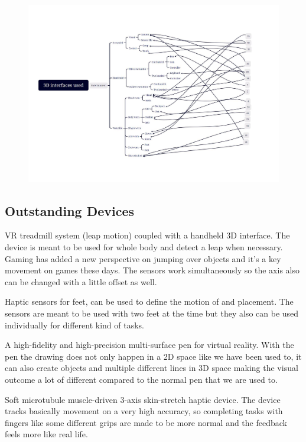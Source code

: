 \begin{figure}[htbp]
	\includegraphics[width=\columnwidth]{figures/entertainment.pdf}
	\label{fig:entertainment}
\end{figure}


\subsection{Outstanding Devices}
VR treadmill system (leap motion) coupled with a handheld 3D interface. The device is meant to be used for whole body and detect a leap when necessary. Gaming has added a new perspective on jumping over objects and it's a key movement on games these days. The sensors work simultaneously so the axis also can be changed with a little offset as well.

Haptic sensors for feet, can be used to define the motion of and placement. The sensors are meant to be used with two feet at the time but they also can be used individually for different kind of tasks. 

A high-fidelity and high-precision multi-surface pen for virtual reality. With the pen the drawing does not only happen in a 2D space like we have been used to, it can also create objects and multiple different lines in 3D space making the visual outcome a lot of different compared to the normal pen that we are used to.

Soft microtubule muscle-driven 3-axis skin-stretch haptic device. The device tracks basically movement on a very high accuracy, so completing tasks with fingers like some different grips are made to be more normal and the feedback feels more like real life.

